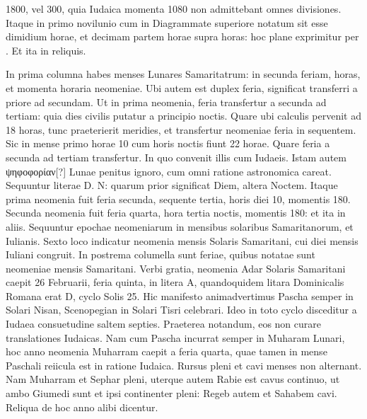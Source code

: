 1800, vel 300, quia Iudaica momenta 1080 non admittebant omnes
divisiones.
Itaque in primo novilunio cum in Diagrammate
superiore notatum sit esse dimidium horae, et decimam partem
horae supra  horas: hoc plane exprimitur per .
Et ita in reliquis.
%
\begin{table}[btp]
  
\end{table}
%
In prima columna habes menses Lunares Samaritatrum:
 in secunda
feriam, horas, et momenta horaria neomeniae.
Ubi autem est duplex
feria, significat transferri a priore ad secundam.
Ut in prima neomenia,
feria transfertur a secunda ad tertiam: quia dies civilis putatur
a principio noctis.
Quare ubi calculis pervenit ad 18 horas, tunc
praeterierit meridies, et transfertur neomeniae feria in sequentem.
Sic
in mense primo horae 10 cum horis noctis fiunt 22 horae.
Quare feria
a secunda ad tertiam transfertur.
In quo convenit illis cum Iudaeis.
Istam autem \textgreek{ψηφοφορίαν[?]} Lunae penitus ignoro,
 cum omni ratione
astronomica careat.
Sequuntur literae \textsc{D. N}: quarum prior significat
Diem, altera Noctem.
Itaque prima neomenia fuit feria secunda, sequente
tertia, horis diei 10, momentis 180.
Secunda neomenia fuit feria
quarta, hora tertia noctis, momentis 180: et ita in aliis.
Sequuntur
epochae neomeniarum in mensibus solaribus Samaritanorum, et Iulianis.
Sexto loco indicatur neomenia mensis Solaris Samaritani, cui
diei mensis Iuliani congruit.
In postrema columella sunt feriae, quibus
notatae sunt neomeniae mensis Samaritani.
Verbi gratia, neomenia
Adar Solaris Samaritani caepit 26 Februarii, feria quinta, in litera
\textsc{A}, quandoquidem litara Dominicalis Romana erat \textsc{D},
 cyclo Solis 25.
Hic manifesto animadvertimus Pascha semper in Solari Nisan, Scenopegian
in Solari Tisri celebrari.
Ideo in toto cyclo disceditur a Iudaea
consuetudine saltem septies.
Praeterea %
 notandum, eos non curare
translationes Iudaicas.
Nam cum Pascha incurrat semper in Muharam
Lunari, hoc anno neomenia Muharram caepit a feria quarta, quae
tamen in mense Paschali reiicula est in ratione Iudaica.
%
Rursus pleni
et cavi menses non alternant.
Nam Muharram et Sephar pleni, uterque
autem Rabie est cavus continuo, ut ambo Giumedi sunt et ipsi
continenter pleni: Regeb autem et Sahabem cavi.
Reliqua de hoc
anno alibi dicentur.
%
